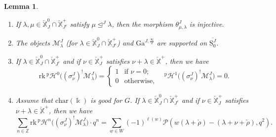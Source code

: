 \documentclass[11pt]{amsart}
\numberwithin{equation}{section}
\theoremstyle{plain}
\newtheorem{lem}[thm]{Lemma}
\theoremstyle{definition}
\newcommand{\sH}{{\mathcal H}}
\renewcommand{\k}{\Bbbk}
\newcommand{\sM}{{\mathcal M}}
\newcommand{\sP}{{\mathcal P}}
\newcommand{\X}{{\mathbb X}}
\newcommand{\Xd}{\check{\X}}
\newcommand{\Z}{{\mathbb Z}}
\newcommand{\cha}{{\mathrm{char}}}
\newcommand{\rk}{\mathrm{rk}}
\newcommand{\semi}{{{\frac{\infty}{2}}}}
\newcommand{\comp}{\mathrm{c}}
\newcommand{\Gait}{\mathrm{Ga}}
\begin{document}
\begin{lem}
\label{lem:costk-Mlambda}
\begin{enumerate}
\item
\label{it:costk-Mlambda-2}
If $\lambda,\mu\in \Xd^0_J\cap \Xd^+_{J^\comp}$ satisfy $\mu \unlhd^J \lambda$, then the morphism $\theta^J_{\mu,\lambda}$ is injective. 
\item
\label{it:costk-Mlambda-1}
The objects $\sM^J_\lambda$ (for $\lambda\in \Xd^0_J\cap \Xd^+_{J^\comp}$) and $\Gait^{J,\semi}$ are supported on $\overline{\mathrm{S}^{J}_{0}}$. 
\item
\label{it:costk-Mlambda-3}
 If $\lambda\in \Xd^0_J\cap \Xd^+_{J^\comp}$ and if $\nu\in \Xd^+_J$ satisfies $\nu+\lambda\in \Xd^+$, then we have 
\[
\rk \, {}^{\mathrm{p}}\sH^0 \big( (\sigma^J_\nu)^!\sM^J_\lambda \big) = \begin{cases}
1 & \text{if $\nu=0$;} \\
0 & \text{otherwise},
\end{cases}
\quad
{}^{\mathrm{p}}\sH^1 \big( (\sigma^J_\nu)^!\sM^J_\lambda \big) = 0.
\]
\item
\label{it:costk-Mlambda-4} 
Assume that $\cha(\k)$ is good for $G$. 
If $\lambda\in \Xd^0_J\cap \Xd^+_{J^\comp}$ and if $\nu\in \Xd^+_J$ satisfies $\nu+\lambda\in \Xd^+$, then we have 
\[
\sum_{n \in \Z} \rk \, {}^{\mathrm{p}}\sH^n \big( (\sigma^J_\nu)^!\sM^J_\lambda \big) \cdot q^n 
= \sum_{w\in W} (-1)^{\ell(w)} \sP(w(\lambda+{\check \rho})- (\lambda+\nu+{\check \rho}), q^2). 
\]
\end{enumerate}
\end{lem}
\end{document}
